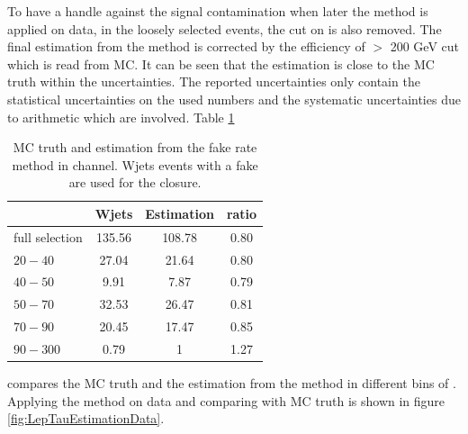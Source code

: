 To have a handle against the signal contamination when later the method is applied 
on data, in the loosely selected events, the cut on \tauMT is also removed. The final estimation from the method is corrected by the efficiency 
of \tauMT $>$ 200 GeV cut which is read from MC. It can be seen that the estimation is close to the MC truth within the uncertainties.
The reported uncertainties only contain the statistical uncertainties on the used numbers and the systematic uncertainties due to arithmetic 
which are involved. Table \ref{tbl:LepTauEstimationClosure}
\begin{table}
\begin{center}
\begin{tabular}{lccc}
\hline
\hline
               &  Wjets& Estimation & ratio\\
\hline
\hline
full selection &  135.56 & 108.78    & 0.80 \\
$20-40$        &  27.04  & 21.64     & 0.80 \\
$40-50$        &  9.91   & 7.87      & 0.79 \\
$50-70$        &  32.53  & 26.47     & 0.81 \\
$70-90$        &  20.45  & 17.47     & 0.85 \\
$90-300$       &  0.79   & 1         & 1.27\\
\hline
\hline
\end{tabular}
\caption{MC truth and estimation from the fake rate method in \muTau channel. Wjets events with a fake \Tau are used for the closure.}
\label{tbl:LepTauEstimationClosure}
\end{center}
\end{table}
compares the MC truth and the estimation from the method in different bins of \mttwo. Applying the method on data and comparing with MC truth is 
shown in figure \ref{fig:LepTauEstimationData}.
